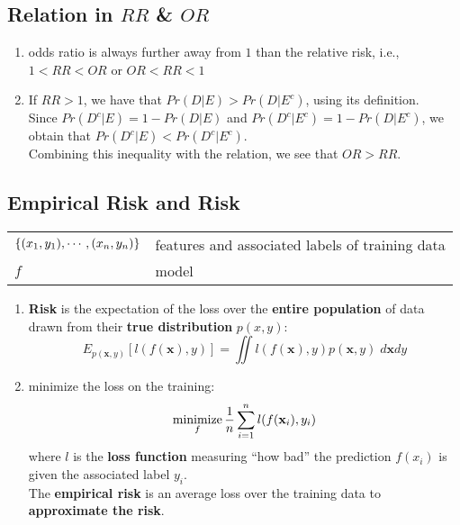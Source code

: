 \subsection*{Relation in $RR$ \& $OR$ \cite{ism-1}}

\begin{enumerate}[itemsep=0.2cm]
    \item odds ratio is always further away from $1$ than the relative risk, i.e., $1 < RR < OR$ or $OR < RR < 1$

    \item If $RR > 1$, we have that $Pr(D|E) > Pr(D|E^c)$, using its definition. \\
    Since $Pr(D^c|E) = 1 - Pr(D|E)$ and $Pr(D^c|E^c) = 1 - Pr(D|E^c)$, we obtain that $Pr(D^c|E) < Pr(D^c|E^c)$.\\
    Combining this inequality with the relation, we see that $OR > RR$.

\end{enumerate}


\subsection{Empirical Risk and Risk \cite{dnn-1}} \label{Empirical Risk and Risk}

\begin{customTableWrapper}{1.5}
\begin{table}[H]
    \centering
    \begin{tabular}{l p{7cm}}
        $\left\{(x_1, y_1), \cdots,(x_n, y_n)\right\}$ & features and associated labels of training data \\

        $f$ & model \\
    \end{tabular}
\end{table}
\end{customTableWrapper}

\begin{enumerate}[itemsep=0.2cm]
    \item \textbf{Risk} is the expectation of the loss over the \textbf{entire population} of data drawn from their \textbf{true distribution} $p(x, y)$:
    \[
        E_{p(\mathbf{x}, y)} [l(f(\mathbf{x}), y)] = \iint l(f(\mathbf{x}), y) p(\mathbf{x}, y) \;d\mathbf{x}dy
    \]
    
    \item minimize the loss on the training: 
    \[
        \displaystyle\mathop{\mathrm{minimize}}_f \dfrac{1}{n} 
        \displaystyle\sum_{i=1}^n l(f(\mathbf{x}_i), y_i)
    \]
    where $l$ is the \textbf{loss function} measuring “how bad” the prediction $f(x_i)$ is given the associated label $y_i$. \\
    The \textbf{empirical risk} is an average loss over the training data to \textbf{approximate the risk}.
    
\end{enumerate}




